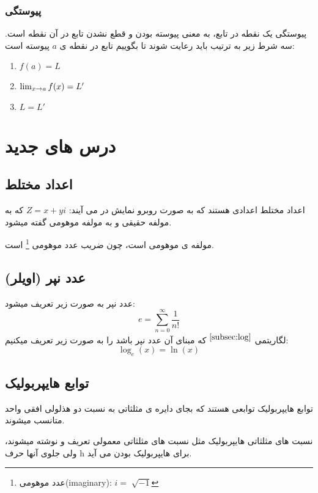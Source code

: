 \documentclass[12pt, a4paper, oneside]{article}
\begin{document}
\subsubsection{پیوستگی}
پیوستگی یک نقطه در تابع، به معنی پیوسته بودن و قطع نشدن تابع در آن نقطه است. سه شرط زیر به ترتیب باید رعایت شوند تا بگوییم تابع در نقطه ی $a$ پیوسته است:
\begin{latin}
\begin{enumerate}
    \item $f(a) = L$
    \item $\lim_{x \to a} f(x) = L'$
    \item $L = L'$
\end{enumerate}
\end{latin}

\section{درس های جدید}
\subsection{اعداد مختلط}
اعداد مختلط اعدادی هستند که به صورت روبرو نمایش در می آیند: $Z = x + yi$
که به  مولفه حقیقی و به  مولفه موهومی گفته میشود.

 مولفه ی موهومی است، چون ضریب عدد موهومی \footnote{عدد موهومی(imaginary): $i=\sqrt[]{-1}$} است.
\subsection{عدد نپر (اویلر)}
عدد نپر به صورت زیر تعریف میشود:
\[e=\sum_{n=0}^{\infty} \frac{1}{n!}\]
لگاریتمی
{$\overset{\ref{subsec:log}}{}$}
 که مبنای آن عدد نپر باشد را به صورت زیر تعریف میکنیم: 
\[\log_e (x) = \ln (x)\]
\subsection{توابع هایپربولیک}
توابع هایپربولیک توابعی هستند که بجای دایره ی مثلثاتی به نسبت دو هذلولی افقی واحد متانسب میشوند.
 

نسبت های مثلثاتی هایپربولیک مثل نسبت های مثلثاتی معمولی تعریف و نوشته میشوند، ولی جلوی آنها حرف h برای هایپربولیک بودن می آید.
\end{document}
